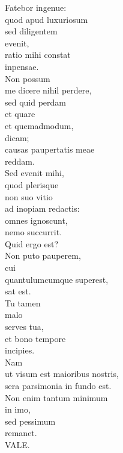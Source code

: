 {\noindent Fatebor ingenue: \\
quod apud luxuriosum \\
\tabto{2em} sed diligentem \\
evenit, \\
ratio mihi constat \\
\tabto{2em} inpensae. \\

\noindent Non possum \\
\tabto{2em} me dicere nihil perdere, \\
sed quid perdam \\
et quare \\
et quemadmodum, \\
\tabto{2em} dicam; \\
causas paupertatis meae \\
\tabto{2em} reddam. \\

\noindent Sed evenit mihi, \\
\tabto{2em} quod plerisque \\
\tabto{3em} non suo vitio \\
\tabto{2em} ad inopiam redactis: \\
omnes ignoscunt, \\
nemo succurrit.\\

\noindent Quid ergo est? \\

\noindent Non puto pauperem, \\
cui \\
\tabto{2em} quantulumcumque superest, \\
sat est. \\

\noindent Tu tamen \\
malo \\
serves tua, \\
et bono tempore \\
\tabto{2em} incipies. \\

\noindent Nam \\
\tabto{2em} ut visum est maioribus nostris, \\
sera parsimonia in fundo est. \\

\noindent Non enim tantum minimum \\
\tabto{2em} in imo, \\
sed pessimum \\
remanet. \\

\noindent VALE.\\

}

